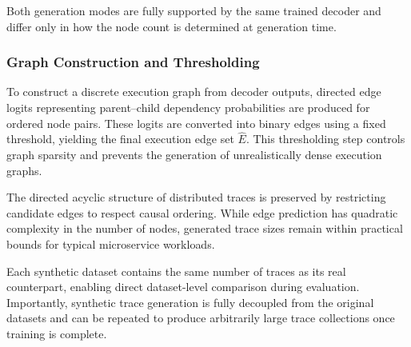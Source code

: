 \documentclass[sigconf,review]{acmart}
\begin{document}
Both generation modes are fully supported by the same trained decoder and differ only in how the node count is determined at generation time.

\subsubsection{Graph Construction and Thresholding}

To construct a discrete execution graph from decoder outputs, directed edge logits representing parent--child dependency probabilities are produced for ordered node pairs. These logits are converted into binary edges using a fixed threshold, yielding the final execution edge set $\hat{E}$. This thresholding step controls graph sparsity and prevents the generation of unrealistically dense execution graphs.

The directed acyclic structure of distributed traces is preserved by restricting candidate edges to respect causal ordering. While edge prediction has quadratic complexity in the number of nodes, generated trace sizes remain within practical bounds for typical microservice workloads.

Each synthetic dataset contains the same number of traces as its real counterpart, enabling direct dataset-level comparison during evaluation. Importantly, synthetic trace generation is fully decoupled from the original datasets and can be repeated to produce arbitrarily large trace collections once training is complete.
\end{document}
